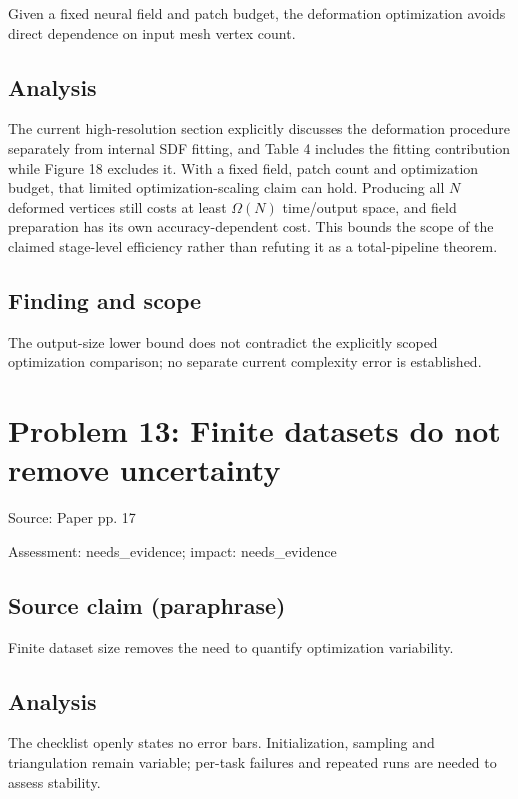 \documentclass[11pt]{article}
\begin{document}
Given a fixed neural field and patch budget, the deformation optimization avoids direct dependence on input mesh vertex count.

\subsection*{Analysis}

The current high-resolution section explicitly discusses the deformation procedure separately from internal SDF fitting, and Table 4 includes the fitting contribution while Figure 18 excludes it. With a fixed field, patch count and optimization budget, that limited optimization-scaling claim can hold. Producing all \(N\) deformed vertices still costs at least \(\Omega(N)\) time/output space, and field preparation has its own accuracy-dependent cost. This bounds the scope of the claimed stage-level efficiency rather than refuting it as a total-pipeline theorem.

\subsection*{Finding and scope}

The output-size lower bound does not contradict the explicitly scoped optimization comparison; no separate current complexity error is established.

\section*{Problem 13: Finite datasets do not remove uncertainty}

Source: Paper pp. 17

Assessment: needs\_evidence; impact: needs\_evidence

\subsection*{Source claim (paraphrase)}

Finite dataset size removes the need to quantify optimization variability.

\subsection*{Analysis}

The checklist openly states no error bars. Initialization, sampling and triangulation remain variable; per-task failures and repeated runs are needed to assess stability.
\end{document}
